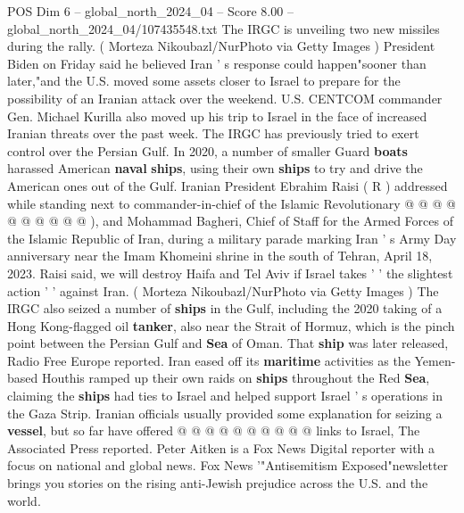 \begin{textsample}{POS Dim 6 – global\_north\_2024\_04 – Score 8.00 – global\_north\_2024\_04/107435548.txt}
The IRGC is unveiling two new missiles during the rally. ( Morteza Nikoubazl/NurPhoto via Getty Images ) President Biden on Friday said he believed Iran ' s response could happen"sooner than later,"and the U.S. moved some assets closer to Israel to prepare for the possibility of an Iranian attack over the weekend.
U.S.
CENTCOM commander Gen.
Michael Kurilla also moved up his trip to Israel in the face of increased Iranian threats over the past week.
The IRGC has previously tried to exert control over the Persian Gulf.
In 2020, a number of smaller Guard \textbf{boats} harassed American \textbf{naval} \textbf{ships}, using their own \textbf{ships} to try and drive the American ones out of the Gulf.
Iranian President Ebrahim Raisi ( R ) addressed while standing next to commander-in-chief of the Islamic Revolutionary @ @ @ @ @ @ @ @ @ @ ), and Mohammad Bagheri, Chief of Staff for the Armed Forces of the Islamic Republic of Iran, during a military parade marking Iran ' s Army Day anniversary near the Imam Khomeini shrine in the south of Tehran, April 18, 2023.
Raisi said, we will destroy Haifa and Tel Aviv if Israel takes ' ' the slightest action ' ' against Iran. ( Morteza Nikoubazl/NurPhoto via Getty Images ) The IRGC also seized a number of \textbf{ships} in the Gulf, including the 2020 taking of a Hong Kong-flagged oil \textbf{tanker}, also near the Strait of Hormuz, which is the pinch point between the Persian Gulf and \textbf{Sea} of Oman.
That \textbf{ship} was later released, Radio Free Europe reported.
Iran eased off its \textbf{maritime} activities as the Yemen-based Houthis ramped up their own raids on \textbf{ships} throughout the Red \textbf{Sea}, claiming the \textbf{ships} had ties to Israel and helped support Israel ' s operations in the Gaza Strip.
Iranian officials usually provided some explanation for seizing a \textbf{vessel}, but so far have offered @ @ @ @ @ @ @ @ @ @ links to Israel, The Associated Press reported.
Peter Aitken is a Fox News Digital reporter with a focus on national and global news.
Fox News '"Antisemitism Exposed"newsletter brings you stories on the rising anti-Jewish prejudice across the U.S. and the world.

\end{textsample}
